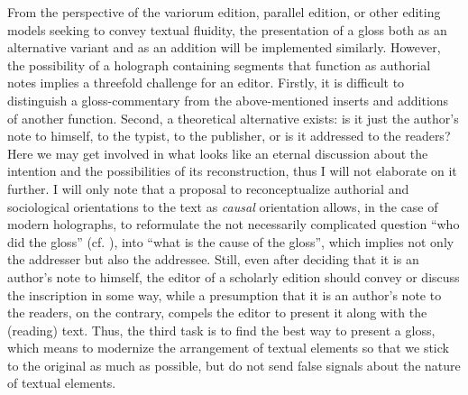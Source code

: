 \begin{paper}
From the perspective of the variorum edition, parallel edition,
or other editing models seeking to convey textual fluidity, the
presentation of a gloss both as an alternative variant and as an
addition will be implemented similarly. However, the possibility of a
holograph containing segments that function as authorial notes implies a
threefold challenge for an editor. Firstly, it is difficult to
distinguish a gloss-commentary from the above-mentioned inserts and
additions of another function. Second, a theoretical alternative exists:
is it just the author's note to himself, to the typist, to the
publisher, or is it addressed to the readers? Here we may get involved
in what looks like an eternal discussion about the intention and the
possibilities of its reconstruction, thus I will not elaborate on it
further. I will only note that a proposal to reconceptualize authorial
and sociological orientations to the text as \emph{causal} orientation
allows, in the case of modern holographs, to reformulate the not
necessarily complicated question ``who did the gloss'' (cf. \citealp[31]{shillingsburg_orientations_2015}), into ``what is the cause of the gloss'',
which implies not only the addresser but also the addressee. Still,
even after deciding that it is an author's note to himself, the editor
of a scholarly edition should convey or discuss the inscription in some
way, while a presumption that it is an author's note to the readers, on
the contrary, compels the editor to present it along with the (reading)
text. Thus, the third task is to find the best way to present a gloss,
which means to modernize the arrangement of textual elements so that we
stick to the original as much as possible, but do not send false signals
about the nature of textual elements.


\end{paper}
